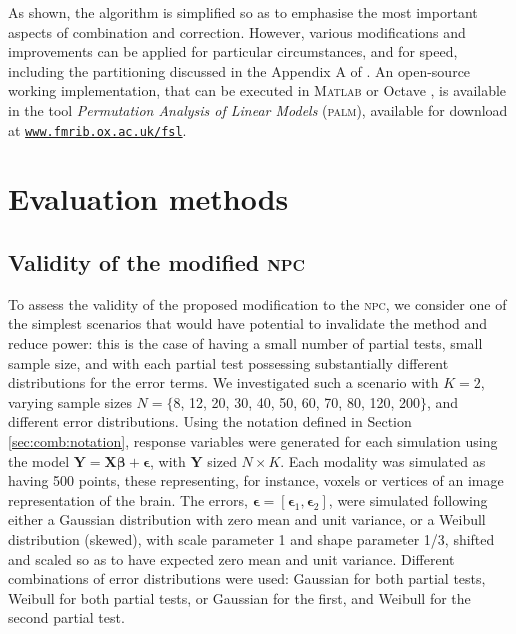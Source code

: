As shown, the algorithm is simplified so as to emphasise the most important aspects of combination and correction. However, various modifications and improvements can be applied for particular circumstances, and for speed, including the partitioning discussed in the Appendix A of \citet{Winkler2014}. An open-source working implementation, that can be executed in \textsc{Matlab} \citep{MATLAB2013} or Octave \citep{Eaton2014}, is available in the tool \emph{Permutation Analysis of Linear Models} (\textsc{palm}), available for download at \href{http://www.fmrib.ox.ac.uk/fsl}{\texttt{www.fmrib.ox.ac.uk/fsl}}.

\section{Evaluation methods}

\subsection{Validity of the modified \textsc{npc}}

To assess the validity of the proposed modification to the \textsc{npc}, we consider one of the simplest scenarios that would have potential to invalidate the method and reduce power: this is the case of having a small number of partial tests, small sample size, and with each partial test possessing substantially different distributions for the error terms. We investigated such a scenario with $K=2$, varying sample sizes $N = \{$8, 12, 20, 30, 40, 50, 60, 70, 80, 120, 200$\}$, and different error distributions. Using the notation defined in Section \ref{sec:comb:notation}, response variables were generated for each simulation using the model $\mathbf{Y} = \mathbf{X}\boldsymbol{\beta} + \boldsymbol{\epsilon}$, with $\mathbf{Y}$ sized $N \times K$. Each modality was simulated as having 500 points, these representing, for instance, voxels or vertices of an image representation of the brain. The errors, $\boldsymbol{\epsilon} = \left[\boldsymbol{\epsilon}_1 , \boldsymbol{\epsilon}_2\right]$, were simulated following either a Gaussian distribution with zero mean and unit variance, or a Weibull distribution (skewed), with scale parameter 1 and shape parameter 1/3, shifted and scaled so as to have expected zero mean and unit variance. Different combinations of error distributions were used: Gaussian for both partial tests, Weibull for both partial tests, or Gaussian for the first, and Weibull for the second partial test.

